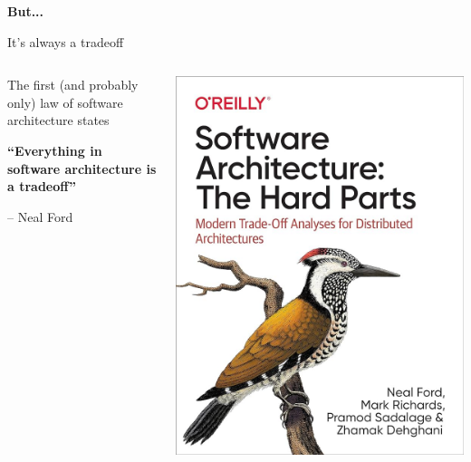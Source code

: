 \begin{frame}
    \begin{center}
    \Huge{\textbf{But...}}
    \end{center}
\end{frame}


\begin{frame}{It's always a tradeoff}
\begin{columns}
    \begin{column}{0.6\textwidth}
        \begin{shadequote}
            \hspace{.5cm}
            The first (and probably only) law of software architecture states


            \textbf{“Everything in software architecture is a tradeoff”}

            \vspace{.3cm}

            -- Neal Ford
        \end{shadequote}
    \end{column}
    \begin{column}{0.4\textwidth}
        \includegraphics[width=.8\textwidth]{./assets/software_architecture}
    \end{column}
\end{columns}
\end{frame}
